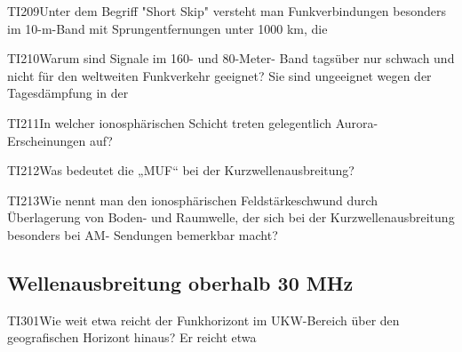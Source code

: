\begin{question}{TI209}{Unter dem Begriff "Short Skip" versteht man Funkverbindungen besonders im 10-m-Band mit Sprungentfernungen unter 1000 km, die}
\end{question}

\begin{question}{TI210}{Warum sind Signale im 160- und 80-Meter- Band tagsüber nur schwach und nicht für den weltweiten Funkverkehr geeignet? Sie sind ungeeignet wegen der Tagesdämpfung in der}
\end{question}

\begin{question}{TI211}{In welcher ionosphärischen Schicht treten gelegentlich Aurora-Erscheinungen auf?}
\end{question}

\begin{question}{TI212}{Was bedeutet die „MUF“ bei der Kurzwellenausbreitung?}
\end{question}

\begin{question}{TI213}{Wie nennt man den ionosphärischen Feldstärkeschwund durch Überlagerung von Boden- und Raumwelle, der sich bei der Kurzwellenausbreitung besonders bei AM- Sendungen bemerkbar macht?}
\end{question}

\subsection{Wellenausbreitung oberhalb 30 MHz}

\begin{question}{TI301}{Wie weit etwa reicht der Funkhorizont im UKW-Bereich über den geografischen Horizont hinaus? Er reicht etwa}
\end{question}


